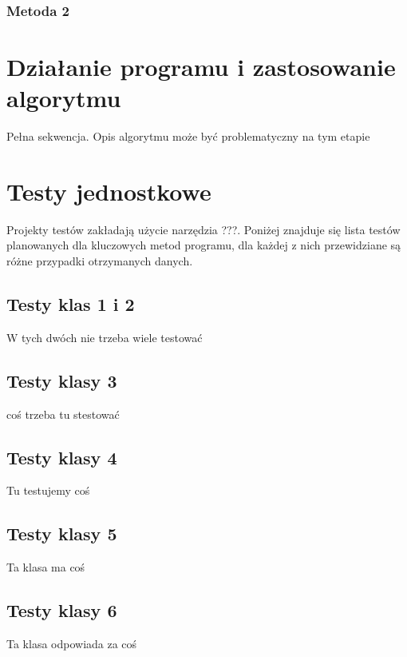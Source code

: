 \documentclass[a4paper,11pt]{article}
\newcommand\tab[1][0.6cm]{\hspace*{#1}}
\begin{document}
\subsubsection{Metoda 2}



\section{Działanie programu i zastosowanie algorytmu}

\tab Pełna sekwencja. Opis algorytmu może być problematyczny na tym etapie

\section{Testy jednostkowe}

\tab Projekty testów zakładają użycie narzędzia ???. Poniżej znajduje się lista testów planowanych dla kluczowych metod programu, dla każdej z nich przewidziane są różne przypadki otrzymanych danych. 

\subsection{Testy klas 1 i 2}

\tab W tych dwóch nie trzeba wiele testować

\subsection{Testy klasy 3}

\tab coś trzeba tu stestować

\subsection{Testy klasy 4}

\tab Tu testujemy coś


\subsection{Testy klasy 5}

\tab Ta klasa ma coś

\subsection{Testy klasy 6}

\tab Ta klasa odpowiada za coś
\end{document}

